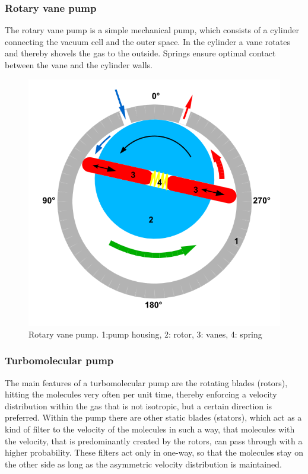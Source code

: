 \documentclass[a4paper]{scrartcl}
\numberwithin{equation}{section}
\numberwithin{figure}{section}
\numberwithin{table}{section}
\begin{document}
\subsubsection{Rotary vane pump}
The rotary vane pump is a simple mechanical pump, which consists of a cylinder connecting the vacuum cell and the outer space. In the cylinder a vane rotates and thereby shovels the gas to the outside. Springs ensure optimal contact between the vane and the cylinder walls. 
\FloatBarrier
\begin{figure}
  \centering
   	\includegraphics[width=0.7\linewidth]{pic/rot.png}
 \caption{\small Rotary vane pump. 1:pump housing, 2: rotor, 3: vanes, 4: spring}
        \label{fig:rot}
\end{figure}

\FloatBarrier

\subsubsection{Turbomolecular pump}
The main features of a turbomolecular pump are the rotating blades (rotors), hitting the molecules very often per unit time, thereby enforcing a velocity distribution within the gas that is not isotropic, but a certain direction is preferred. Within the pump there are other static blades (stators), which act as a kind of filter to the velocity of the molecules in such a way, that molecules with the velocity, that is predominantly created by the rotors, can pass through with a higher probability. These filters act only in one-way, so that the molecules stay on the other side as long as the asymmetric velocity distribution is maintained. 
\end{document}
